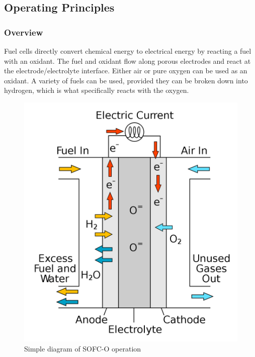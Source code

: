 \subsection{Operating Principles}

    \subsubsection{Overview}
    Fuel cells directly convert chemical energy to electrical energy by reacting a fuel with an oxidant. The fuel and oxidant flow along porous electrodes and react at the electrode/electrolyte interface. Either air or pure oxygen can be used as an oxidant. A variety of fuels can be used, provided they can be broken down into hydrogen, which is what specifically reacts with the oxygen.
    
    
    \begin{figure}[h]
        \centering
        \includegraphics[scale=0.2]{1200px-Solid_oxide_fuel_cell.png}
        \caption{Simple diagram of SOFC-O operation \cite{LM1}}
        \label{LMfig:SOFCbasic}
    \end{figure}
    
